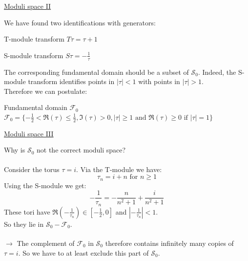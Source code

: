 \documentclass[11pt,aspectratio=169]{beamer}
\begin{document}
\begin{frame}{\underline{Moduli space II}}

	We have found two identifications with generators:
	\begin{block}{T-module transform}
		$T\tau = \tau + 1$
	\end{block}
	\begin{block}{S-module transform}
		$S\tau = -\frac{1}{\tau}$
	\end{block}
	The corresponding fundamental domain should be a subset of $\mathcal{S}_{0}$. Indeed, the S-module transform identifies points in $|\tau| < 1$ with points in $|\tau| > 1$.
	\\
	Therefore we can postulate:
	\begin{block}{Fundamental domain $\mathcal{F}_{0}$}
		$\mathcal{F}_{0} = \{-\frac{1}{2} < \Re(\tau) \leq \frac{1}{2}, \Im(\tau) > 0, |\tau| \geq 1 \textrm{ and } \Re(\tau) \geq 0 \textrm{ if } |\tau| = 1\}$
	\end{block}
	
\end{frame}

\begin{frame}{\underline{Moduli space III}}

	Why is $\mathcal{S}_0$ not the correct moduli space?
	\\~\\
	Consider the torus $\tau = i$. Via the T-module we have:
	\begin{equation}
		\tau_n = i + n \textrm{ for } n \geq 1
	\end{equation}
	Using the S-module we get:
	\begin{equation}
		-\frac{1}{\tau_n} = -\frac{n}{n^2 + 1} + \frac{i}{n^2 + 1}
	\end{equation}
	These tori have $\Re(-\frac{1}{\tau_n}) \in [-\frac{1}{2}, 0]$ and $|-\frac{1}{\tau_n}| < 1$. 
	\\
	So they lie in $\mathcal{S}_0 - \mathcal{F}_0$.
	\\~\\
	$\rightarrow$ The complement of $\mathcal{F}_0$ in $\mathcal{S}_0$ therefore contains infinitely many copies of $\tau = i$. So we have to at least exclude this part of $\mathcal{S}_0$.
	
\end{frame}
\end{document}
